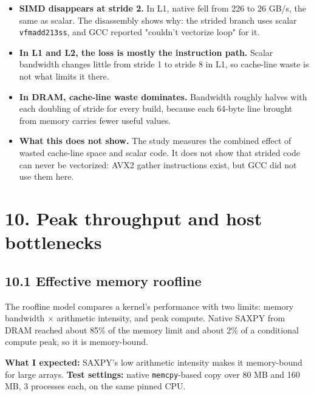 \documentclass[10pt,letterpaper]{article}
\begin{document}
\begin{itemize}\setlength{\itemsep}{2pt}

\item \textbf{SIMD disappears at stride 2.} In L1, native fell from 226 to 26 GB/s, the same as scalar. The disassembly shows why: the strided branch uses scalar \texttt{vfmadd213ss}, and GCC reported "couldn't vectorize loop" for it.

\item \textbf{In L1 and L2, the loss is mostly the instruction path.} Scalar bandwidth changes little from stride 1 to stride 8 in L1, so cache-line waste is not what limits it there.

\item \textbf{In DRAM, cache-line waste dominates.} Bandwidth roughly halves with each doubling of stride for every build, because each 64-byte line brought from memory carries fewer useful values.

\item \textbf{What this does not show.} The study measures the combined effect of wasted cache-line space and scalar code. It does not show that strided code can never be vectorized: AVX2 gather instructions exist, but GCC did not use them here.

\end{itemize}

\section*{10. Peak throughput and host bottlenecks}

\subsection*{10.1 Effective memory roofline}

The roofline model compares a kernel's performance with two limits: memory bandwidth $\times$ arithmetic intensity, and peak compute. Native SAXPY from DRAM reached about 85\% of the memory limit and about 2\% of a conditional compute peak, so it is memory-bound.


\textbf{What I expected:} SAXPY's low arithmetic intensity makes it memory-bound for large arrays. \textbf{Test settings:} native \texttt{memcpy}-based copy over 80 MB and 160 MB, 3 processes each, on the same pinned CPU.
\end{document}

